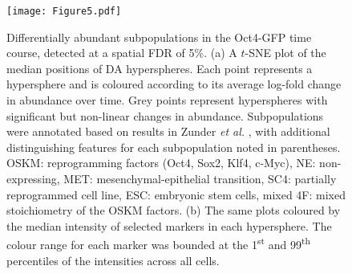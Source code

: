 \documentclass{article}
\begin{document}
\begin{figure}[p]
    \begin{center}
    \texttt{[image: Figure5.pdf]}
\end{center}
    \caption{
        Differentially abundant subpopulations in the Oct4-GFP time course, detected at a spatial FDR of 5\%.
        (a) A $t$-SNE plot of the median positions of DA hyperspheres. 
        Each point represents a hypersphere and is coloured according to its average log-fold change in abundance over time.
        Grey points represent hyperspheres with significant but non-linear changes in abundance.
        Subpopulations were annotated based on results in Zunder \emph{et al.} \cite{zunder2015continuous}, with additional distinguishing features for each subpopulation noted in parentheses.
        OSKM: reprogramming factors (Oct4, Sox2, Klf4, c-Myc), NE: non-expressing, MET: mesenchymal-epithelial transition, SC4: partially reprogrammed cell line, ESC: embryonic stem cells, mixed 4F: mixed stoichiometry of the OSKM factors.
        (b) The same plots coloured by the median intensity of selected markers in each hypersphere.
        The colour range for each marker was bounded at the 1\textsuperscript{st} and 99\textsuperscript{th} percentiles of the intensities across all cells.
    }

    \label{fig:oct4}
\end{figure}
\end{document}
